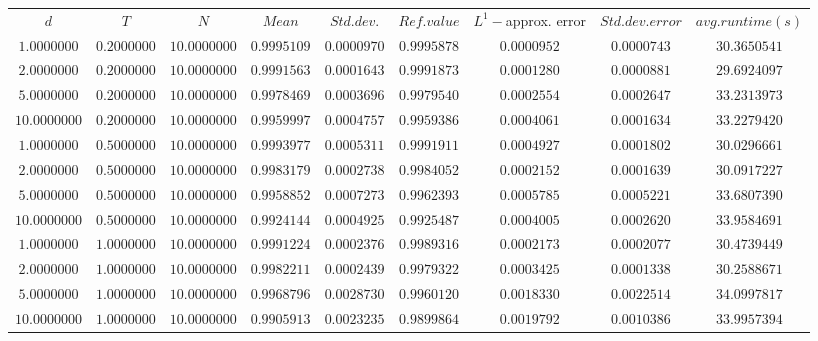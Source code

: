 \begin{tabular}{ccccccccc}
$d$ & $T$ & $N$ & $Mean$ & $Std. dev.$ & $Ref. value$ & $L^1-$approx. error & $Std. dev. error$ & $avg. runtime (s)$\\
$1.0000000$ & $0.2000000$ & $10.0000000$ & $0.9995109$ & $0.0000970$ & $0.9995878$ & $0.0000952$ & $0.0000743$ & $30.3650541$\\
$2.0000000$ & $0.2000000$ & $10.0000000$ & $0.9991563$ & $0.0001643$ & $0.9991873$ & $0.0001280$ & $0.0000881$ & $29.6924097$\\
$5.0000000$ & $0.2000000$ & $10.0000000$ & $0.9978469$ & $0.0003696$ & $0.9979540$ & $0.0002554$ & $0.0002647$ & $33.2313973$\\
$10.0000000$ & $0.2000000$ & $10.0000000$ & $0.9959997$ & $0.0004757$ & $0.9959386$ & $0.0004061$ & $0.0001634$ & $33.2279420$\\
$1.0000000$ & $0.5000000$ & $10.0000000$ & $0.9993977$ & $0.0005311$ & $0.9991911$ & $0.0004927$ & $0.0001802$ & $30.0296661$\\
$2.0000000$ & $0.5000000$ & $10.0000000$ & $0.9983179$ & $0.0002738$ & $0.9984052$ & $0.0002152$ & $0.0001639$ & $30.0917227$\\
$5.0000000$ & $0.5000000$ & $10.0000000$ & $0.9958852$ & $0.0007273$ & $0.9962393$ & $0.0005785$ & $0.0005221$ & $33.6807390$\\
$10.0000000$ & $0.5000000$ & $10.0000000$ & $0.9924144$ & $0.0004925$ & $0.9925487$ & $0.0004005$ & $0.0002620$ & $33.9584691$\\
$1.0000000$ & $1.0000000$ & $10.0000000$ & $0.9991224$ & $0.0002376$ & $0.9989316$ & $0.0002173$ & $0.0002077$ & $30.4739449$\\
$2.0000000$ & $1.0000000$ & $10.0000000$ & $0.9982211$ & $0.0002439$ & $0.9979322$ & $0.0003425$ & $0.0001338$ & $30.2588671$\\
$5.0000000$ & $1.0000000$ & $10.0000000$ & $0.9968796$ & $0.0028730$ & $0.9960120$ & $0.0018330$ & $0.0022514$ & $34.0997817$\\
$10.0000000$ & $1.0000000$ & $10.0000000$ & $0.9905913$ & $0.0023235$ & $0.9899864$ & $0.0019792$ & $0.0010386$ & $33.9957394$\\
\end{tabular}
